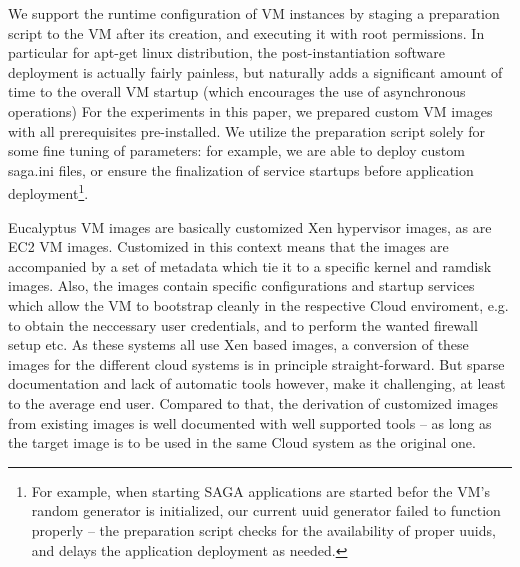 \documentclass[conference,final]{IEEEtran}
\begin{document}
We support the runtime configuration of VM instances by staging a
preparation script to the VM after its creation, and executing it with
root permissions.  In particular for apt-get linux distribution, the
post-instantiation software deployment is actually fairly painless,
but naturally adds a significant amount of time to the overall VM
startup (which encourages the use of asynchronous operations)
For the experiments in this paper, we prepared custom VM images with
all prerequisites pre-installed.  We utilize the preparation script
solely for some fine tuning of parameters: for example, we are able to
deploy custom saga.ini files, or ensure the finalization of service
startups before application deployment\footnote{For example, when
  starting SAGA applications are started befor the VM's random
  generator is initialized, our current uuid generator failed to
  function properly -- the preparation script checks for the
  availability of proper uuids, and delays the application deployment
  as needed.}.

Eucalyptus VM images are basically customized Xen hypervisor images,
as are EC2 VM images.  Customized in this context means that the
images are accompanied by a set of metadata which tie it to a specific
kernel and ramdisk images.  Also, the images contain specific
configurations and startup services which allow the VM to bootstrap
cleanly in the respective Cloud enviroment, e.g. to obtain the
neccessary user credentials, and to perform the wanted firewall setup
etc.  As these systems all use Xen based images, a conversion of these
images for the different cloud systems is in principle
straight-forward.  But sparse documentation and lack of automatic
tools however, make it challenging, at least to the average end
user. Compared to that, the derivation of customized images from
existing images is well documented with well supported tools -- as
long as the target image is to be used in the same Cloud system as the
original one.
\end{document}
